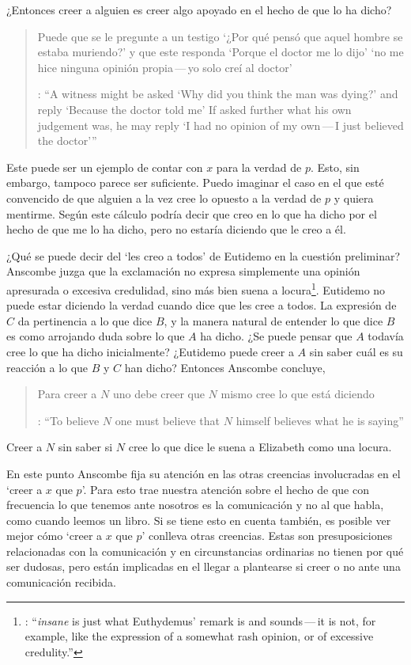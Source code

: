¿Entonces creer a alguien es creer algo apoyado en el hecho de que lo ha dicho? \blockquote[{\cite[4]{anscombe2008faith:tobelieve}}: \enquote{A witness might be asked `Why did you think the man was dying?' and reply `Because the doctor told me' \textelp{} If asked further what his own judgement was, he may reply `I had no opinion of my own\,---\,I just believed the doctor'}]{Puede que se le pregunte a un testigo `¿Por qué pensó que aquel hombre se estaba muriendo?' y que este responda `Porque el doctor me lo dijo' \textelp{} `no me hice ninguna opinión propia\,---\,yo solo creí al doctor'}. Este puede ser un ejemplo de contar con $x$ para la verdad de $p$. Esto, sin embargo, tampoco parece ser suficiente. Puedo imaginar el caso en el que esté convencido de que alguien a la vez cree lo opuesto a la verdad de $p$ y quiera mentirme. Según este cálculo podría decir que creo en lo que ha dicho por el hecho de que me lo ha dicho, pero no estaría diciendo que le creo a él.

¿Qué se puede decir del \enquote*{les creo a todos} de Eutidemo en la cuestión preliminar? Anscombe juzga que la exclamación no expresa simplemente una opinión apresurada o excesiva credulidad, sino más bien suena a locura\footnote{\cite[Cf.~][5]{anscombe2008faith:tobelieve}: \enquote{\emph{insane} is just what Euthydemus' remark is and sounds\,---\,it is not, for example, like the expression of a somewhat rash opinion, or of excessive credulity.}}. Eutidemo no puede estar diciendo la verdad cuando dice que les cree a todos. La expresión de $C$ da pertinencia a lo que dice $B$, y la manera natural de entender lo que dice $B$ es como arrojando duda sobre lo que $A$ ha dicho. ¿Se puede pensar que $A$ todavía cree lo que ha dicho inicialmente? ¿Eutidemo puede creer a $A$ sin saber cuál es su reacción a lo que $B$ y $C$ han dicho? Entonces Anscombe concluye, \blockquote[{\cite[5]{anscombe2008faith:tobelieve}}: \enquote{To believe $N$ one must believe that $N$ himself believes what he is saying}]{Para creer a $N$ uno debe creer que $N$ mismo cree lo que está diciendo}. Creer a $N$ sin saber si $N$ cree lo que dice le suena a Elizabeth como una locura.

En este punto Anscombe fija su atención en las otras creencias involucradas en el `creer a $x$ que $p$'. Para esto trae nuestra atención sobre el hecho de que con frecuencia lo que tenemos ante nosotros es la comunicación y no al que habla, como cuando leemos un libro. Si se tiene esto en cuenta también, es posible ver mejor cómo `creer a $x$ que $p$' conlleva otras creencias. Estas son presuposiciones relacionadas con la comunicación y en circunstancias ordinarias no tienen por qué ser dudosas, pero están implicadas en el llegar a plantearse si creer o no ante una comunicación recibida.

